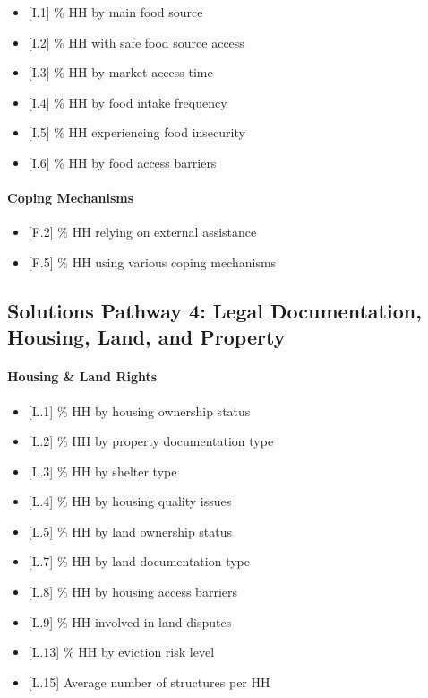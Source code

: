 \documentclass[
]{report}
\providecommand{\tightlist}{%
  \setlength{\itemsep}{0pt}\setlength{\parskip}{0pt}}
\begin{document}
\begin{itemize}
\tightlist
\item
  {[}I.1{]} \% HH by main food source
\item
  {[}I.2{]} \% HH with safe food source access
\item
  {[}I.3{]} \% HH by market access time
\item
  {[}I.4{]} \% HH by food intake frequency
\item
  {[}I.5{]} \% HH experiencing food insecurity
\item
  {[}I.6{]} \% HH by food access barriers
\end{itemize}

\paragraph{Coping Mechanisms}\label{coping-mechanisms}

\begin{itemize}
\tightlist
\item
  {[}F.2{]} \% HH relying on external assistance
\item
  {[}F.5{]} \% HH using various coping mechanisms
\end{itemize}

\subsection{Solutions Pathway 4: Legal Documentation, Housing, Land, and
Property}\label{solutions-pathway-4-legal-documentation-housing-land-and-property}

\paragraph{Housing \& Land Rights}\label{housing-land-rights}

\begin{itemize}
\tightlist
\item
  {[}L.1{]} \% HH by housing ownership status
\item
  {[}L.2{]} \% HH by property documentation type
\item
  {[}L.3{]} \% HH by shelter type
\item
  {[}L.4{]} \% HH by housing quality issues
\item
  {[}L.5{]} \% HH by land ownership status
\item
  {[}L.7{]} \% HH by land documentation type
\item
  {[}L.8{]} \% HH by housing access barriers
\item
  {[}L.9{]} \% HH involved in land disputes
\item
  {[}L.13{]} \% HH by eviction risk level
\item
  {[}L.15{]} Average number of structures per HH
\end{itemize}
\end{document}
